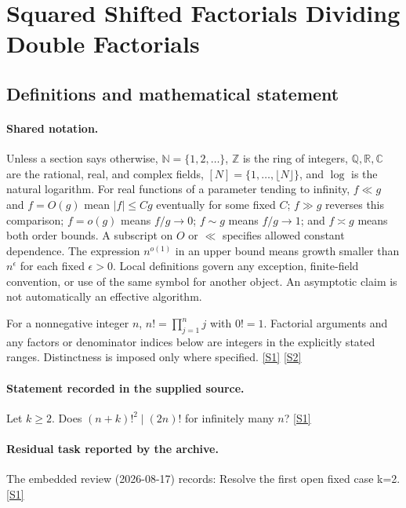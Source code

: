 \documentclass[11pt,a4paper]{article}
\newcommand{\N}{\mathbb{N}}
\newcommand{\Z}{\mathbb{Z}}
\newcommand{\Q}{\mathbb{Q}}
\newcommand{\R}{\mathbb{R}}
\newcommand{\C}{\mathbb{C}}
\newcommand{\sref}[2]{\hyperlink{source:#1:#2}{[S#2]}}
\begin{document}
\section{Squared Shifted Factorials Dividing Double Factorials}\label{statement}


\subsection{Definitions and mathematical statement}

\paragraph{Shared notation.}Unless a section says otherwise, $\N=\{1,2,\ldots\}$,
$\Z$ is the ring of integers, $\Q,\R,\C$ are the rational, real, and complex
fields, $[N]=\{1,\ldots,\lfloor N\rfloor\}$, and $\log$ is the natural
logarithm. For real functions of a parameter tending to infinity,
$f\ll g$ and $f=O(g)$ mean $|f|\leq Cg$ eventually for some fixed $C$;
$f\gg g$ reverses this comparison; $f=o(g)$ means $f/g\to0$;
$f\sim g$ means $f/g\to1$; and $f\asymp g$ means both order bounds.
A subscript on $O$ or $\ll$ specifies allowed constant dependence.
The expression $n^{o(1)}$ in an upper bound means growth smaller than
$n^\epsilon$ for each fixed $\epsilon>0$. Local definitions govern any
exception, finite-field convention, or use of the same symbol for another
object. An asymptotic claim is not automatically an effective algorithm.



For a nonnegative integer $n$, $n!=\prod_{j=1}^n j$ with $0!=1$. Factorial arguments and any factors or denominator indices below are integers in the explicitly stated ranges. Distinctness is imposed only where specified. \sref{statement}{1} \sref{statement}{2}

\paragraph{Statement recorded in the supplied source.}
Let $k\geq 2$. Does $ (n+k)!^2 \mid (2n)! $ for infinitely many $n$? \sref{statement}{1}

\paragraph{Residual task reported by the archive.}

The embedded review (2026-08-17) records: Resolve the first open fixed case k=2. \sref{statement}{1}
\end{document}
